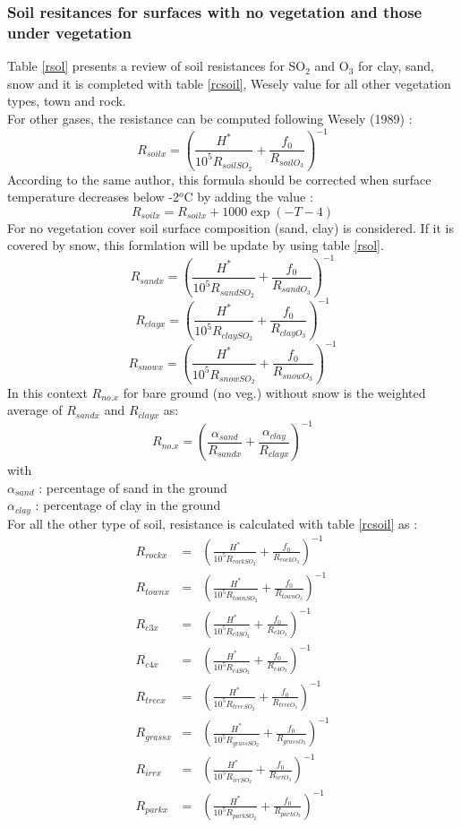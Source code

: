 \subsubsection*{Soil resitances for surfaces with no vegetation and those
under vegetation}
Table \ref{rsol} presents a review of soil resistances for SO$_2$ and O$_3$
for clay, sand, snow and it is completed
with table \ref{rcsoil}, Wesely value for all other vegetation types, 
town and rock.\\
For other gases, the resistance can be computed following Wesely (1989) :
\[ R_{soilx} = (\frac{H^*}{10^5 R_{soilSO_2}}+ \frac{f_0}{R_{soilO_3}})^{-1} \]
According to the same author, this formula should be corrected when surface
temperature decreases below -2$^o$C by adding the value :
\[R_{soilx} =  R_{soilx} + 1000 \exp (-T-4) \]
For no vegetation cover soil surface composition
(sand, clay) is considered. If it is 
covered by snow, this formlation will be update by using table \ref{rsol}. 
\[ R_{sandx} = (\frac{H^*}{10^5 R_{sandSO_2}}+ \frac{f_0}{R_{sandO_3}})^{-1} \]
\[ R_{clayx} = (\frac{H^*}{10^5 R_{claySO_2}}+ \frac{f_0}{R_{clayO_3}})^{-1} \]
\[ R_{snowx} = (\frac{H^*}{10^5 R_{snowSO_2}}+ \frac{f_0}{R_{snowO_3}})^{-1} \]
In this context $R_{no.x}$ for bare ground (no veg.) without snow is
the weighted average of $R_{sandx}$ and $R_{clayx}$ as: 
$$ R_{no.x} = ( \frac{\alpha_{sand}}{R_{sandx}} +
                \frac{\alpha_{clay}}{R_{clayx}} )^{-1} $$
with\\
$\alpha_{sand}$ : percentage of sand in the ground \\
$\alpha_{clay}$ : percentage of clay in the ground \\
For all the other type of soil, resistance is calculated with table
\ref{rcsoil} as :
\begin{eqnarray*} 
R_{rockx} & = & (\frac{H^*}{10^5 R_{rockSO_2}}+
        \frac{f_0}{R_{rockO_3}})^{-1}  \\
R_{townx} & = & (\frac{H^*}{10^5 R_{townSO_2}}+
        \frac{f_0}{R_{townO_3}})^{-1} \\
R_{c3x} & = & (\frac{H^*}{10^5 R_{c3SO_2}}+ \frac{f_0}{R_{c3O_3}})^{-1} \\
R_{c4x} & = & (\frac{H^*}{10^5 R_{c4SO_2}}+ \frac{f_0}{R_{c4O_3}})^{-1} \\
R_{treex} & = & (\frac{H^*}{10^5 R_{treeSO_2}}+
        \frac{f_0}{R_{treeO_3}})^{-1} \\
R_{grassx} & = & (\frac{H^*}{10^5 R_{grassSO_2}}+
        \frac{f_0}{R_{grassO_3}})^{-1} \\
R_{irrx} & = & (\frac{H^*}{10^5 R_{irrSO_2}}+
        \frac{f_0}{R_{irrO_3}})^{-1} \\
R_{parkx} & = & (\frac{H^*}{10^5 R_{parkSO_2}}+
        \frac{f_0}{R_{parkO_3}})^{-1} \\
\end{eqnarray*}

